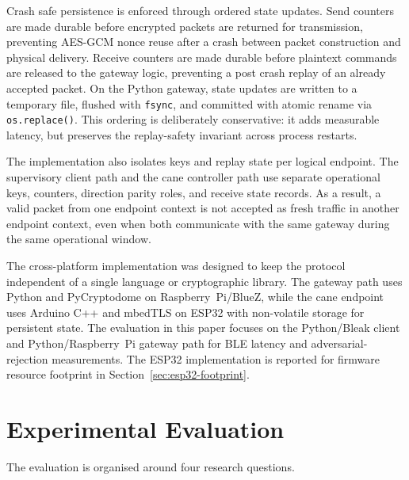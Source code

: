 \documentclass[journal]{IEEEtran}
\begin{document}
Crash safe persistence is enforced through ordered state updates. Send counters are made durable before encrypted packets are returned for transmission, preventing AES-GCM nonce reuse after a crash between packet construction and physical delivery. Receive counters are made durable before plaintext commands are released to the gateway logic, preventing a post crash replay of an already accepted packet. On the Python gateway, state updates are written to a temporary file, flushed with \texttt{fsync}, and committed with atomic rename via \texttt{os.replace()}. This ordering is deliberately conservative: it adds measurable latency, but preserves the replay-safety invariant across process restarts.

The implementation also isolates keys and replay state per logical endpoint. The supervisory client path and the cane controller path use separate operational keys, counters, direction parity roles, and receive state records. As a result, a valid packet from one endpoint context is not accepted as fresh traffic in another endpoint context, even when both communicate with the same gateway during the same operational window.

The cross-platform implementation was designed to keep the protocol independent of a single language or cryptographic library. The gateway path uses Python and PyCryptodome on Raspberry~Pi/BlueZ, while the cane endpoint uses Arduino C++ and mbedTLS on ESP32 with non-volatile storage for persistent state. The evaluation in this paper focuses on the Python/Bleak client and Python/Raspberry~Pi gateway path for BLE latency and adversarial-rejection measurements. The ESP32 implementation is reported for firmware resource footprint in Section~\ref{sec:esp32-footprint}.


\section{Experimental Evaluation}
\label{sec:eval}

The evaluation is organised around four research questions.
\end{document}
